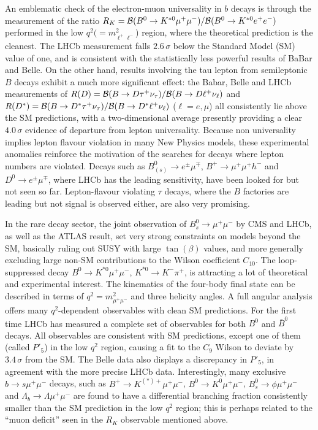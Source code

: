 \noindent An emblematic check of the electron-muon universality in $b$ decays is through the measurement of the ratio $R_K = 
{\cal B}(B^0 \to K^{*0}\mu^+\mu^-)/ {\cal B}(B^0 \to K^{*0}e^+e^-)$ performed in the low 
$q^2 (= m_{\ell^+\ell^-}^2$) region, where the  theoretical prediction is the cleanest. The LHCb measurement falls  
$2.6\,\sigma$ below the Standard Model (SM) value of one, 
and is consistent with the statistically less powerful results of BaBar 
and Belle. On the other hand, results involving the tau lepton from semileptonic $B$ decays exhibit a much more
significant effect: the Babar, Belle and LHCb measurements of 
$R(D) = {\cal B}(B \to D\tau^+\nu_\tau)/ {\cal B}(B \to D\ell^+\nu_\ell)$ and
$R(D^*) = {\cal B}(B \to D^*\tau^+\nu_\tau)/ {\cal B}(B \to D^*\ell^+\nu_\ell)$ ($\ell = e, \mu$) all consistently lie above 
the SM predictions, with a two-dimensional average presently providing a clear $4.0\,\sigma$ evidence of 
departure from lepton universality.
%
Because non universality implies lepton flavour violation in many New Physics models, these experimental anomalies
reinforce the motivation of the searches for decays where lepton numbers are violated. 
Decays such as $B^0_{(s)} \to e^\pm\mu^\mp$, $B^+\to \mu^+\mu^+h^-$ and $D^0 \to e^\pm\mu^\mp$, where LHCb 
has the leading sensitivity, have been looked for but not seen so far. Lepton-flavour violating $\tau$ decays, where 
the $B$ factories are leading but not signal is observed either, are also very promising.
\medskip

\noindent In the rare decay sector, the joint observation of $B^0_s \to \mu^+\mu^-$ by CMS and LHCb, as well as the ATLAS result, set very strong constraints on models beyond the SM, basically ruling out SUSY with large $\tan(\beta)$ values, and more generally excluding large non-SM contributions to the Wilson coefficient $C_{10}$. The loop-suppressed decay $B^0 \to K^{*0}\mu^+\mu^-$, $K^{*0}\to K^-\pi^+$, is attracting a lot of theoretical and experimental interest. The kinematics of the four-body final state can be described in terms of $q^2 = m_{\mu^+\mu^-}^2$ and three helicity angles. A full angular analysis offers many $q^2$-dependent observables with clean SM predictions. For the first time LHCb has measured a complete set of observables for both $B^0$ and $\bar{B}^0$ decays. All observables are consistent with SM predictions, except one of them (called $P'_5$) in the low $q^2$ region, causing a fit to the $C_9$ Wilson to deviate by  $3.4\,\sigma$ from the SM. The Belle data also displays a discrepancy in $P'_5$, in agreement with the more precise LHCb data. Interestingly, many exclusive $b\to s \mu^+\mu^-$ decays, such as $B^+ \to K^{(*)+}\mu^+\mu^-$,  $B^0 \to K^0\mu^+\mu^-$, $B^0_s \to\phi \mu^+\mu^-$ and 
$\Lambda_b \to \Lambda  \mu^+\mu^-$ are found to have a differential branching fraction  consistently smaller than the SM prediction in the low $q^2$ region; this is perhaps related to the ``muon deficit'' seen in the $R_K$ observable mentioned above.

